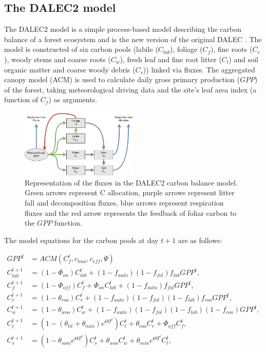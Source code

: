 \documentclass[11pt]{article}
\begin{document}
\subsection{The DALEC2 model}

The DALEC2 model is a simple process-based model describing the carbon balance of a forest ecosystem \citep{Bloom2014} and is the new version of the original DALEC \citep{williams2005improved}. The model is constructed of six carbon pools (labile ($C_{lab}$), foliage ($C_f$), fine roots ($C_r$), woody stems and coarse roots ($C_w$), fresh leaf and fine root litter ($C_l$) and soil organic matter and coarse woody debris ($C_s$)) linked via fluxes. The aggregated canopy model (ACM) \citep{williams1997predicting} is used to calculate daily gross primary production ($GPP$) of the forest, taking meteorological driving data and the site's leaf area index (a function of $C_f$) as arguments.   

\begin{figure}[ht]
    \centering
    \includegraphics[width=0.5\textwidth]{Dalecdiagram.png}
    \caption{Representation of the fluxes in the DALEC2 carbon balance model. Green arrows represent C allocation, purple arrows represent litter fall and decomposition fluxes, blue arrows represent respiration fluxes and the red arrow represents the feedback of foliar carbon to the $GPP$ function.}
    \label{fig:DALEC_mod}
\end{figure}

The model equations for the carbon pools at day $t+1$ are as follows:

\begin{align}
GPP^{t} &= ACM(C_f^{t}, c_{lma}, c_{eff}, \Psi) \label{GPP}
\\C_{lab}^{t+1}&=(1-\Phi _{on})C_{lab}^{t}+(1-f_{auto})(1-f_{fol})f_{lab}GPP^{t}, \label{daleclab}
\\C_f^{t+1}&=(1-\Phi_{off})C_f^{t}+\Phi_{on}C_{lab}^{t}+(1-f_{auto})f_{fol}GPP^{t}, \label{dalec1}
\\C_r^{t+1}&=(1-\theta_{roo})C_r^{t}+(1-f_{auto})(1-f_{fol})(1-f_{lab})f_{roo}GPP^{t}, 
\\C_w^{t+1}&=(1-\theta_{woo})C_w^{t}+(1-f_{auto})(1-f_{fol})(1-f_{lab})(1-f_{roo})GPP^{t}, 
\\C_l^{t+1}&=(1-(\theta_{lit}+\theta_{min})e^{\Theta T^{t}})C_l^{t}+\theta_{roo}C_r^{t}+\Phi_{off}C_f^{t}, 
\\C_s^{t+1}&=(1-\theta_{som}e^{\Theta T^{t}})C_s^{t}+\theta_{woo}C_w^{t}+\theta_{min}e^{\Theta T^{t}}C_l^{t}, \label{dalec5}
\end{align}
\end{document}
